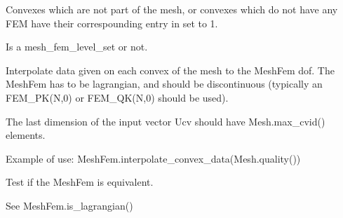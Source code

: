 \documentclass[a4paper,11pt,english]{sphinxmanual}
\begin{document}
\begin{fulllineitems}
\begin{fulllineitems}
Convexes which are not part of the mesh, or convexes which do not
have any FEM have their correspounding entry in  set to \sphinxhyphen{}1.

\end{fulllineitems}


\begin{fulllineitems}
\label{\detokenize{python/cmdref_MeshFem:getfem.MeshFem.has_linked_mesh_levelset}}
Is a mesh\_fem\_level\_set or not.

\end{fulllineitems}


\begin{fulllineitems}
\label{\detokenize{python/cmdref_MeshFem:getfem.MeshFem.interpolate_convex_data}}
Interpolate data given on each convex of the mesh to the MeshFem dof.
The MeshFem has to be lagrangian, and should be discontinuous (typically
an FEM\_PK(N,0) or FEM\_QK(N,0) should be used).

The last dimension of the input vector Ucv should have
Mesh.max\_cvid() elements.

Example of use: MeshFem.interpolate\_convex\_data(Mesh.quality())

\end{fulllineitems}


\begin{fulllineitems}
\label{\detokenize{python/cmdref_MeshFem:getfem.MeshFem.is_equivalent}}
Test if the MeshFem is equivalent.

See MeshFem.is\_lagrangian()

\end{fulllineitems}



\end{fulllineitems}
\end{document}
